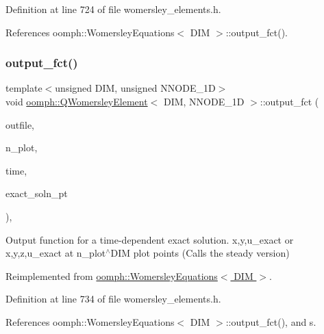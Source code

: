 Definition at line 724 of file womersley\+\_\+elements.\+h.



References oomph\+::\+Womersley\+Equations$<$ D\+I\+M $>$\+::output\+\_\+fct().

\mbox{\label{classoomph_1_1QWomersleyElement_a2730f3cf9212c0b5cbc22939a376af07}} 
\subsubsection{\texorpdfstring{output\+\_\+fct()}{output\_fct()}\hspace{0.1cm}{\footnotesize\ttfamily [2/2]}}
{\footnotesize\ttfamily template$<$unsigned D\+IM, unsigned N\+N\+O\+D\+E\+\_\+1D$>$ \\
void \hyperlink{classoomph_1_1QWomersleyElement}{oomph\+::\+Q\+Womersley\+Element}$<$ D\+IM, N\+N\+O\+D\+E\+\_\+1D $>$\+::output\+\_\+fct (\begin{DoxyParamCaption}\item[{std\+::ostream \&}]{outfile,  }\item[{const unsigned \&}]{n\+\_\+plot,  }\item[{const double \&}]{time,  }\item[{\hyperlink{classoomph_1_1FiniteElement_ad4ecf2b61b158a4b4d351a60d23c633e}{Finite\+Element\+::\+Unsteady\+Exact\+Solution\+Fct\+Pt}}]{exact\+\_\+soln\+\_\+pt }\end{DoxyParamCaption})\hspace{0.3cm}{\ttfamily [inline]}, {\ttfamily [virtual]}}



Output function for a time-\/dependent exact solution. x,y,u\+\_\+exact or x,y,z,u\+\_\+exact at n\+\_\+plot$^\wedge$\+D\+IM plot points (Calls the steady version) 



Reimplemented from \hyperlink{classoomph_1_1WomersleyEquations_ab1468b769eeb97f0a603526531e01564}{oomph\+::\+Womersley\+Equations$<$ D\+I\+M $>$}.



Definition at line 734 of file womersley\+\_\+elements.\+h.



References oomph\+::\+Womersley\+Equations$<$ D\+I\+M $>$\+::output\+\_\+fct(), and s.

